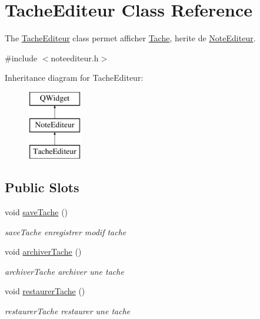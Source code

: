 \hypertarget{class_tache_editeur}{}\section{Tache\+Editeur Class Reference}
\label{class_tache_editeur}


The \hyperlink{class_tache_editeur}{Tache\+Editeur} class permet afficher \hyperlink{class_tache}{Tache}, herite de \hyperlink{class_note_editeur}{Note\+Editeur}.  




{\ttfamily \#include $<$noteediteur.\+h$>$}

Inheritance diagram for Tache\+Editeur\+:\begin{figure}[H]
\begin{center}
\leavevmode
\includegraphics[height=3.000000cm]{class_tache_editeur}
\end{center}
\end{figure}
\subsection*{Public Slots}
\begin{DoxyCompactItemize}
\item 
\mbox{\label{class_tache_editeur_ae66a6647327326909fe6c2b189e5591c}} 
void \hyperlink{class_tache_editeur_ae66a6647327326909fe6c2b189e5591c}{save\+Tache} ()
\begin{DoxyCompactList}\small\item\em save\+Tache enregistrer modif tache \end{DoxyCompactList}\item 
\mbox{\label{class_tache_editeur_a66120f2d402709daa1caa49e141d98d9}} 
void \hyperlink{class_tache_editeur_a66120f2d402709daa1caa49e141d98d9}{archiver\+Tache} ()
\begin{DoxyCompactList}\small\item\em archiver\+Tache archiver une tache \end{DoxyCompactList}\item 
\mbox{\label{class_tache_editeur_a5205ef76ed8c9d39efdbb1912aa886fe}} 
void \hyperlink{class_tache_editeur_a5205ef76ed8c9d39efdbb1912aa886fe}{restaurer\+Tache} ()
\begin{DoxyCompactList}\small\item\em restaurer\+Tache restaurer une tache \end{DoxyCompactList}\end{DoxyCompactItemize}
